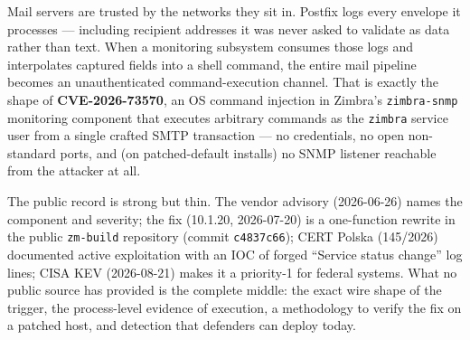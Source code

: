 \documentclass[journal]{IEEEtran}
\begin{document}
Mail servers are trusted by the networks they sit in. Postfix logs every
envelope it processes — including recipient addresses it was never asked to
validate as data rather than text. When a monitoring subsystem consumes those
logs and interpolates captured fields into a shell command, the entire mail
pipeline becomes an unauthenticated command-execution channel. That is exactly
the shape of \textbf{CVE-2026-73570}, an OS command injection in Zimbra's
\texttt{zimbra-snmp} monitoring component that executes arbitrary commands as
the \texttt{zimbra} service user from a single crafted SMTP transaction — no
credentials, no open non-standard ports, and (on patched-default installs) no
SNMP listener reachable from the attacker at all.

The public record is strong but thin. The vendor advisory (2026-06-26) names the
component and severity; the fix (10.1.20, 2026-07-20) is a one-function rewrite
in the public \texttt{zm-build} repository (commit \texttt{c4837c66}); CERT
Polska (145/2026) documented active exploitation with an IOC of forged
``Service status change'' log lines; CISA KEV (2026-08-21) makes it a
priority-1 for federal systems. What no public source has provided is the
complete middle: the exact wire shape of the trigger, the process-level evidence
of execution, a methodology to verify the fix on a patched host, and detection
that defenders can deploy today.
\end{document}
